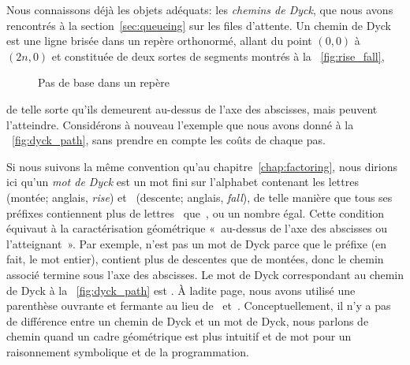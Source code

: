 Nous connaissons déjà les objets adéquats: les \emph{chemins de
  Dyck}, que nous avons rencontrés à la
section~\ref{sec:queueing} sur les files d'attente. Un
chemin de Dyck est une ligne brisée dans un repère orthonormé, allant
du point \((0,0)\) à \((2n,0)\) et constituée de deux sortes de
segments montrés à la \fig~\vref{fig:rise_fall},
\begin{figure}[b]
\centering
{}
\qquad
{}
\caption{Pas de base dans un repère}
\label{fig:rise_fall}
\end{figure}
de telle sorte qu'ils demeurent au-dessus de l'axe des abscisses, mais
peuvent l'atteindre. Considérons à nouveau l'exemple que nous avons
donné à la \fig~\vref{fig:dyck_path}, sans prendre en compte les coûts
de chaque pas.

Si nous suivons la même convention qu'au
chapitre~\ref{chap:factoring}, nous dirions ici qu'un \emph{mot de
  Dyck} est un mot fini sur
l'alphabet contenant les lettres~ (montée; anglais,
\emph{rise}) et~ (descente;
anglais, \emph{fall}), de telle manière
que tous ses préfixes contiennent
plus de lettres~ que~, ou un nombre égal. Cette
condition équivaut à la caractérisation géométrique «~au-dessus de
l'axe des abscisses ou l'atteignant~». Par exemple,  n'est pas
un mot de Dyck parce que le préfixe  (en fait, le mot
entier), contient plus de descentes que de montées, donc le chemin
associé termine sous l'axe des abscisses. Le mot de Dyck correspondant
au chemin de Dyck à la \fig~\vref{fig:dyck_path} est
. À ladite page, nous avons utilisé une parenthèse
ouvrante et fermante au lieu de~
et~. Conceptuellement, il n'y a pas de différence entre un
chemin de Dyck et un mot de Dyck, nous parlons de chemin quand un
cadre géométrique est plus intuitif et de mot pour un raisonnement
symbolique et de la programmation.

